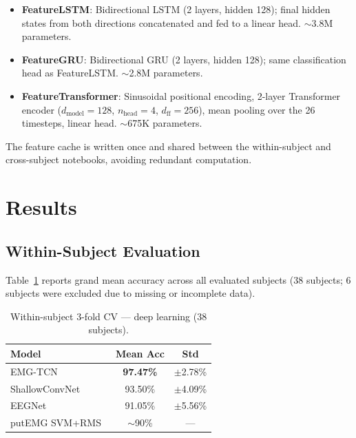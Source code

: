 \documentclass[11pt,twocolumn]{article}
\begin{document}
\begin{itemize}[noitemsep]
  \item \textbf{FeatureLSTM}: Bidirectional LSTM (2 layers, hidden 128); final
        hidden states from both directions concatenated and fed to a linear head.
        $\sim$3.8M parameters.
  \item \textbf{FeatureGRU}: Bidirectional GRU (2 layers, hidden 128); same
        classification head as FeatureLSTM. $\sim$2.8M parameters.
  \item \textbf{FeatureTransformer}: Sinusoidal positional encoding, 2-layer
        Transformer encoder ($d_\text{model}=128$, $n_\text{head}=4$,
        $d_\text{ff}=256$), mean pooling over the 26 timesteps, linear head.
        $\sim$675K parameters.
\end{itemize}

The feature cache is written once and shared between the within-subject and
cross-subject notebooks, avoiding redundant computation.

\section{Results}

\subsection{Within-Subject Evaluation}

Table~\ref{tab:within} reports grand mean accuracy across all evaluated subjects
(38 subjects; 6 subjects were excluded due to missing or incomplete data).

\begin{table}[h]
\centering
\caption{Within-subject 3-fold CV — deep learning (38 subjects).}
\label{tab:within}
\begin{tabular}{lcc}
\toprule
\textbf{Model} & \textbf{Mean Acc} & \textbf{Std} \\
\midrule
EMG-TCN        & \textbf{97.47\%}  & $\pm$2.78\% \\
ShallowConvNet & 93.50\%           & $\pm$4.09\% \\
EEGNet         & 91.05\%           & $\pm$5.56\% \\
\midrule
putEMG SVM+RMS~\cite{kaczmarek2019putemg} & $\sim$90\% & --- \\
\bottomrule
\end{tabular}
\end{table}
\end{document}
